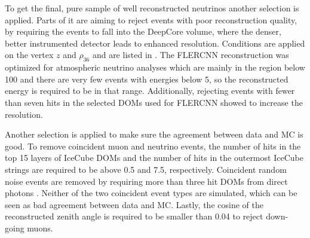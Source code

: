 To get the final, pure sample of well reconstructed neutrinos another selection is applied. Parts of it are aiming to reject events with poor reconstruction quality, by requiring the events to fall into the DeepCore volume, where the denser, better instrumented detector leads to enhanced resolution. Conditions are applied on the vertex $z$ and $\rho_{36}$ and are listed in . The FLERCNN reconstruction was optimized for atmospheric neutrino analyses which are mainly in the region below \SI{100}{\gev} and there are very few events with energies below \SI{5}{\gev}, so the reconstructed energy is required to be in that range. Additionally, rejecting events with fewer than seven hits in the selected DOMs used for FLERCNN showed to increase the resolution.

Another selection is applied to make sure the agreement between data and MC is good. To remove coincident muon and neutrino events, the number of hits in the top 15 layers of IceCube DOMs and the number of hits in the outermost IceCube strings are required to be above 0.5 and 7.5, respectively. Coincident random noise events are removed by requiring more than three hit DOMs from direct photons . Neither of the two coincident event types are simulated, which can be seen as bad agreement between data and MC. Lastly, the cosine of the reconstructed zenith angle is required to be smaller than 0.04 to reject down-going muons.

